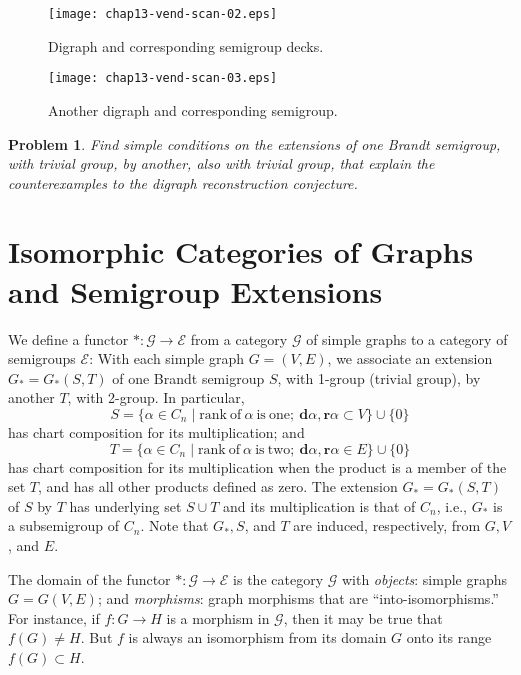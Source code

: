 \documentclass{surv-l}
\numberwithin{equation}{section}
\numberwithin{table}{section}
\numberwithin{figure}{section}
\newtheorem{problem}[equation]{Problem}
\theoremstyle{definition}
\begin{document}
\begin{figure}[!h]
\texttt{[image: chap13-vend-scan-02.eps]}
\caption{Digraph and corresponding semigroup decks.\label{fig13.66.2}}
\end{figure}

\begin{figure}[!h]
\texttt{[image: chap13-vend-scan-03.eps]}
\caption{Another digraph and corresponding semigroup.\label{fig13.66.3}}
\end{figure}

\setcounter{equation}{3}
\begin{problem}\label{prob13.66.4}
Find simple conditions on the extensions of one
Brandt semigroup, with trivial group, by another,
also with trivial group, that explain the counterexamples to the
digraph reconstruction conjecture.
\end{problem}

\section{Isomorphic Categories of Graphs and Semigroup Extensions}\label{sec13.67}

We define a functor $*:\mathcal{G}\rightarrow \mathcal{E}$
from a category $\mathcal{G}$ of simple graphs to a category
of semigroups $\mathcal{E}$: With each simple graph $G=(V,
E)$, we associate an extension $G_{\ast}=G_{\ast}(S,T)$ of one
Brandt semigroup $S$, with 1-group (trivial group), by another
$T$, with 2-group. In particular,
\[
S=\{\alpha\in C_{n}\mid \mathrm{rank\ of}\ \alpha\ \mathrm{is\ one;}\
\mathbf{d}\alpha,\mathbf{r}\alpha\subset V\} \cup\{0\}
\]
has chart composition for its multiplication; and
\[
T=\{\alpha\in C_{n}\mid \mathrm{rank\ of}\ \alpha\ \mathrm{is\ two;}\
\mathbf{d}\alpha,\mathbf{r}\alpha\in E\}\cup\{0\}
\]
has chart composition for its multiplication when the product
is a member of the set $T$, and has all other products defined
as zero. The extension $G_{\ast}=G_{\ast}(S, T)$ of $S$ by $T$
has underlying set $S \cup T$ and its multiplication is that
of $C_{n}$, i.e., $G_{\ast}$ is a subsemigroup of $C_{n}$.
Note that $G_{\ast}, S$, and $T$ are induced, respectively,
from $G, V$, and $E$.

The domain of the functor $*:\mathcal{G}\rightarrow \mathcal{E}$
is the category $\mathcal{G}$ with \emph{objects}: simple graphs
$G=G(V, E)$; and \emph{morphisms}: graph morphisms that are
``into-isomorphisms.'' For instance, if $f : G\rightarrow H$ is a
morphism in $\mathcal{G}$, then it may be true that $ f(G)\neq H$.
But $f$ is always an isomorphism from its domain $G$ onto its
range $ f(G)\subset H$.
\end{document}
